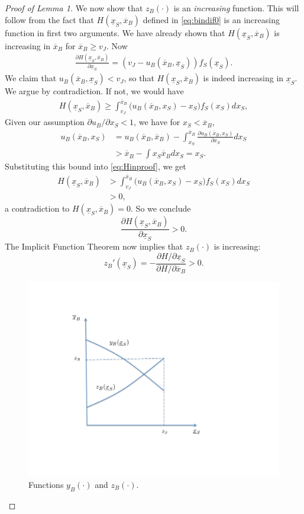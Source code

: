 \documentclass[11pt,twopage]{article}
\newcommand{\ol}{\overline}
\newcommand{\ul}{\underline}
\begin{document}
\begin{proof}[Proof of Lemma 1]
  We now show that $z_B(\cdot)$ is an \emph{increasing} function. This
  will follow from the fact that $ H(\underline x_S,\ol x_B)$ defined
  in \eqref{eq:bindif0} is an increasing function in first two
  arguments. We have already shown that $H(\ul x_S,\ol x_B)$ is
  increasing in $\ol x_B$ for $\ol x_B \geq v_J$. Now
  \begin{align*}
    \frac{\partial H(\underline x_S,\ol x_B)}{\partial \ul x_S}=
    (v_J-u_B(\ol x_B,\ul x_S))f_S(\ul x_S).
  \end{align*}
  We claim that $u_B(\ol x_B,\ul x_S)<v_J$, so that $H(\ul x_S, \ol
  x_B)$ is indeed increasing in $\ul x_S$. We argue by
  contradiction. If not, we would have
  \begin{align}
    H(\ul x_S, \ol x_B) \geq \int_{v_J}^{\ol x_B} \Big( u_B(\ol x_B,
    x_S) - x_S \Big) f_S(x_S)dx_S,\label{eq:Hinproof}
  \end{align}
  Given our assumption $\partial u_B/\partial x_S <1$, we have for
  $x_S < \ol x_B$,
  \begin{align*}
    u_B(\ol x_B, x_S)& = u_B(\ol x_B, \ol x_B) - \int_{x_S}^{\ol x_B}
    \frac{\partial u_B(\ol x_B,x_S)}{\partial x_S} dx_S
    \\
    &> \ol x_B - \int{x_S}{\ol x_B} dx_S = x_S.
  \end{align*}
  Substituting this bound into \eqref{eq:Hinproof}, we get
  \begin{align*}
    H(\ul x_S, \ol x_B) &> \int_{v_J}^{\ol x_B} \Big( u_B(\ol x_B,x_S)
    - x_S \Big) f_S(x_S)dx_S
    \\
    &>0,
  \end{align*}
  a contradiction to $H(\ul x_S, \ol x_B) = 0$. So we conclude
  \[ \frac{\partial H(\underline x_S,\ol x_B)}{\partial \ul x_S}>0.
  \]
  The Implicit Function Theorem now implies that $z_B(\cdot)$ is
  increasing:
  \[ z_B'(\ul x_S) = - \frac{\partial H/\partial \ul x_S}{\partial H
    /\partial \ol x_B}>0. \]

\begin{figure}[ht]
  \centering
  \includegraphics[scale = 0.6]{graphics/intersection.pdf}
  \caption{Functions $y_B(\cdot)$ and $z_B(\cdot)$.}
  \label{fig:intersection}
\end{figure}



\end{proof}
\end{document}

